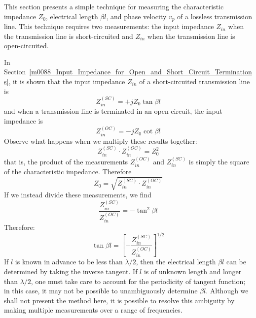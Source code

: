 

\label{m0089_Measurement_of_Transmission_Line_Characteristics} %

This section presents a simple technique for measuring the characteristic impedance $Z_0$, electrical length $\beta l$, and phase velocity $v_p$ of a lossless transmission line.
This technique requires two measurements: the input impedance $Z_{in}$ when the transmission line is short-circuited and $Z_{in}$ when the transmission line is open-circuited.

In Section~\ref{m0088_Input_Impedance_for_Open_and_Short_Circuit_Terminations}, it is shown that the input impedance $Z_{in}$ of a short-circuited transmission line is
%
\begin{equation}
Z_{in}^{(SC)} = +jZ_0 \tan\beta l
\nonumber 
\end{equation}
%
and when a transmission line is terminated in an open circuit, the input impedance is
%
\begin{equation}
Z_{in}^{(OC)} = -jZ_0 \cot\beta l 
\nonumber
\end{equation}
%
Observe what happens when we multiply these results together:
%
\begin{equation}
Z_{in}^{(SC)} \cdot Z_{in}^{(OC)} = Z_0^2
\nonumber
\end{equation}
%
that is, the product of the measurements $Z_{in}^{(OC)}$ and  $Z_{in}^{(SC)}$ is simply the square of the characteristic impedance.
Therefore
%
\begin{equation}
Z_0 = \sqrt{ Z_{in}^{(SC)} \cdot Z_{in}^{(OC)} }
\end{equation}
%
If we instead divide these measurements, we find
%
\begin{equation}
\frac{ Z_{in}^{(SC)} }{ Z_{in}^{(OC)} } = -\tan^2\beta l
\nonumber
\end{equation}
%
Therefore:
%
\begin{equation}
\tan\beta l = \left[ - \frac{ Z_{in}^{(SC)} }{ Z_{in}^{(OC)} }  \right]^{1/2}
\end{equation}
%
If $l$ is known in advance to be less than $\lambda/2$, then the electrical length $\beta l$ can be determined by taking the inverse tangent.
If $l$ is of unknown length and longer than $\lambda/2$, one must take care to account for the periodicity of tangent function; in this case, it may not be possible to unambiguously determine $\beta l$.
Although we shall not present the method here, it is possible to resolve this ambiguity by making multiple measurements over a range of frequencies.

